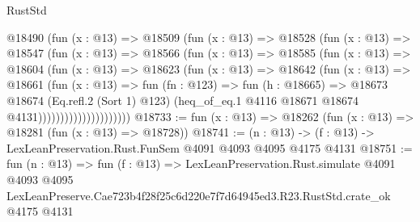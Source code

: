 \begin{lexlean}{RustStd}
\begin{coremodule}
                      @18490
                        (fun (x : @13) =>
                        @18509
                          (fun (x : @13) =>
                          @18528
                            (fun (x : @13) =>
                            @18547
                              (fun (x : @13) =>
                              @18566
                                (fun (x : @13) =>
                                @18585
                                  (fun (x : @13) =>
                                  @18604
                                    (fun (x : @13) =>
                                    @18623
                                      (fun (x : @13) =>
                                      @18642
                                        (fun (x : @13) =>
                                        @18661
                                          (fun (x : @13) =>
                                          fun (fn : @123) =>
                                          fun (h : @18665) =>
                                          @18673
                                            @18674
                                            (Eq.refl.{2} (Sort 1) @123)
                                            (heq_of_eq.{1}
                                              @4116
                                              @18671
                                              @18674
                                              @4131)))))))))))))))))))))
@18733 := fun (x : @13) => @18262 (fun (x : @13) => @18281 (fun (x : @13) => @18728))
@18741 := (n : @13) -> (f : @13) -> LexLeanPreservation.Rust.FunSem @4091 @4093 @4095 @4175 @4131
@18751 := fun (n : @13) =>
  fun (f : @13) =>
  LexLeanPreservation.Rust.simulate
    @4091
    @4093
    @4095
    LexLeanPreserve.Cae723b4f28f25c6d220e7f7d64945ed3.R23.RustStd.crate_ok
    @4175
    @4131
\end{coremodule}
\end{lexlean}
